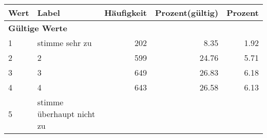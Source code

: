      \begin{longtable}{lXrrr}
     \toprule
     \textbf{Wert} & \textbf{Label} & \textbf{Häufigkeit} & \textbf{Prozent(gültig)} & \textbf{Prozent} \\
     \endhead
     \midrule
     \multicolumn{5}{l}{\textbf{Gültige Werte}}\\

     1 &
     \multicolumn{1}{X}{ stimme sehr zu   } &


       \num{202} &
       \num[round-mode=places,round-precision=2]{8,35} &
         \num[round-mode=places,round-precision=2]{1,92} \\

     2 &
     \multicolumn{1}{X}{ 2   } &


       \num{599} &
       \num[round-mode=places,round-precision=2]{24,76} &
         \num[round-mode=places,round-precision=2]{5,71} \\

     3 &
     \multicolumn{1}{X}{ 3   } &


       \num{649} &
       \num[round-mode=places,round-precision=2]{26,83} &
         \num[round-mode=places,round-precision=2]{6,18} \\

     4 &
     \multicolumn{1}{X}{ 4   } &


       \num{643} &
       \num[round-mode=places,round-precision=2]{26,58} &
         \num[round-mode=places,round-precision=2]{6,13} \\

     5 &
     \multicolumn{1}{X}{ stimme überhaupt nicht zu   } &



\end{longtable}
